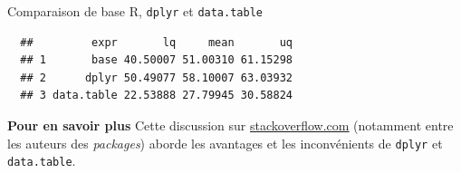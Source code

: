 \documentclass[12pt,ignorenonframetext,]{beamer}
\newenvironment{Shaded}{}{}
\newcommand{\KeywordTok}[1]{\textcolor[rgb]{0.00,0.00,1.00}{#1}}
\newcommand{\DataTypeTok}[1]{#1}
\newcommand{\StringTok}[1]{\textcolor[rgb]{0.00,0.50,0.50}{#1}}
\newcommand{\CommentTok}[1]{\textcolor[rgb]{0.00,0.50,0.00}{#1}}
\newcommand{\OperatorTok}[1]{#1}
\newcommand{\NormalTok}[1]{#1}
\renewenvironment{Shaded}{\begin{snugshade}}{\end{snugshade}}
\newcommand{\intertitre}[1]{\textcolor{redInsee}{\textbf{#1}}}
\begin{document}
\begin{frame}[fragile]{Comparaison de base R, \texttt{dplyr} et
\texttt{data.table}}

\footnotesize

\begin{Shaded}
\end{Shaded}

\pause \vspace{-5mm}

\begin{verbatim}
  ##         expr       lq     mean       uq
  ## 1       base 40.50007 51.00310 61.15298
  ## 2      dplyr 50.49077 58.10007 63.03932
  ## 3 data.table 22.53888 27.79945 30.58824
\end{verbatim}

\pause \normalsize

\intertitre{Pour en savoir plus} Cette discussion sur
\href{http://stackoverflow.com/questions/21435339/data-table-vs-dplyr-can-one-do-something-well-the-other-cant-or-does-poorly}{\underline{stackoverflow.com}}
(notamment entre les auteurs des \emph{packages}) aborde les avantages
et les inconvénients de \texttt{dplyr} et \texttt{data.table}.

\end{frame}
\end{document}
